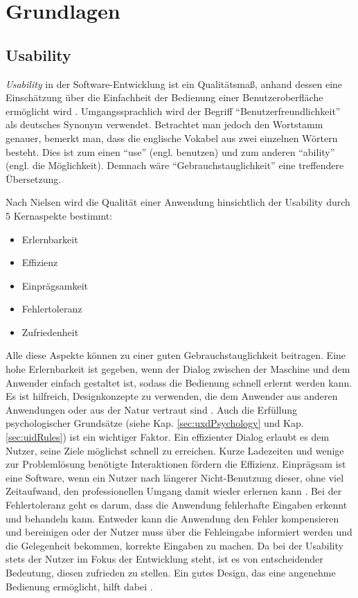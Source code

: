 \chapter{Grundlagen}
\section{Usability}
\textit{Usability} in der Software-Entwicklung ist ein Qualitätsmaß, anhand dessen eine Einschätzung über die Einfachheit der Bedienung einer Benutzeroberfläche ermöglicht wird \cite{Nielsen2012}. Umgangssprachlich wird der Begriff \enquote{Benutzerfreundlichkeit} als deutsches Synonym verwendet. Betrachtet man jedoch den Wortstamm genauer, bemerkt man, dass die englische Vokabel aus zwei einzelnen Wörtern besteht. Dies ist zum einen \enquote{use} (engl. benutzen) und zum anderen \enquote{ability} (engl. die Möglichkeit).  Demnach wäre \enquote{Gebrauchstauglichkeit} eine treffendere Übersetzung.\cite{Rampl2007}

Nach Nielsen wird die Qualität einer Anwendung hinsichtlich der Usability durch 5 Kernaspekte bestimmt:
\begin{itemize}
	\item Erlernbarkeit
	\item Effizienz
	\item Einprägsamkeit
	\item Fehlertoleranz
	\item Zufriedenheit \cite{Nielsen2012}
\end{itemize}
Alle diese Aspekte können zu einer guten Gebrauchstauglichkeit beitragen. Eine hohe Erlernbarkeit ist gegeben, wenn der Dialog zwischen der Maschine und dem Anwender einfach gestaltet ist, sodass die Bedienung schnell erlernt werden kann. Es ist hilfreich, Designkonzepte zu verwenden, die dem Anwender aus anderen Anwendungen oder aus der Natur vertraut sind \cite[Learnability]{UsabilityFirstGlossary}. Auch die Erfüllung psychologischer Grundsätze (siehe Kap. \ref{sec:uxdPsychology} und Kap. \ref{sec:uidRules}) ist ein wichtiger Faktor. Ein effizienter Dialog erlaubt es dem Nutzer, seine Ziele möglichst schnell zu erreichen. Kurze Ladezeiten und wenige zur Problemlösung benötigte Interaktionen fördern die Effizienz. Einprägsam ist eine Software, wenn ein Nutzer nach längerer Nicht-Benutzung dieser, ohne viel Zeitaufwand, den professionellen Umgang damit wieder erlernen kann \cite{Nielsen2012}. Bei der Fehlertoleranz geht es darum, dass die Anwendung fehlerhafte Eingaben erkennt und behandeln kann. Entweder kann die Anwendung den Fehler kompensieren und bereinigen oder der Nutzer muss über die Fehleingabe informiert werden und die Gelegenheit bekommen, korrekte Eingaben zu machen. Da bei der Usability stets der Nutzer im Fokus der Entwicklung steht, ist es von entscheidender Bedeutung, diesen zufrieden zu stellen. Ein gutes Design, das eine angenehme Bedienung ermöglicht, hilft dabei \cite{Nielsen2012}. \par

